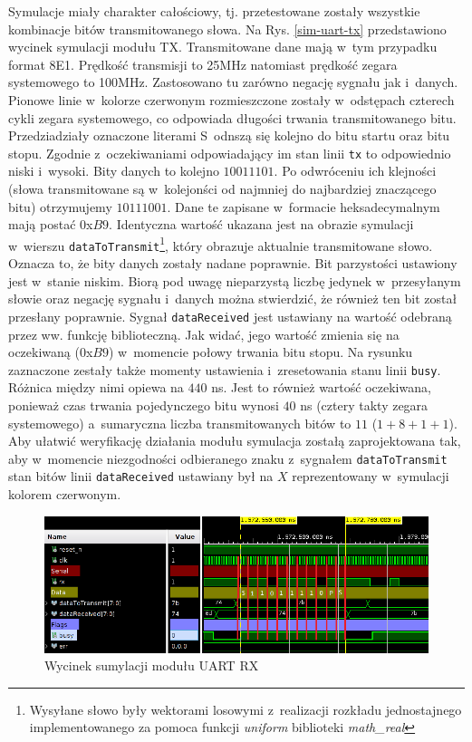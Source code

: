 Symulacje miały charakter całościowy, tj. przetestowane zostały wszystkie kombinacje bitów transmitowanego słowa. Na Rys. \ref{sim-uart-tx} przedstawiono wycinek symulacji modułu TX. Transmitowane dane mają w~tym przypadku format 8E1. Prędkość transmisji to 25MHz natomiast prędkość zegara systemowego to 100MHz. Zastosowano tu zarówno negację sygnału jak i~danych. Pionowe linie w~kolorze czerwonym rozmieszczone zostały w~odstępach czterech cykli zegara systemowego, co odpowiada długości trwania transmitowanego bitu. Przedziadziały oznaczone literami S~odnszą się kolejno do bitu startu oraz bitu stopu. Zgodnie z~oczekiwaniami odpowiadający im stan linii \verb|tx| to odpowiednio niski i~wysoki. Bity danych to kolejno $10011101$. Po odwróceniu ich klejności (słowa transmitowane są w~kolejonści od najmniej do najbardziej znaczącego bitu) otrzymujemy $10111001$. Dane te zapisane w~formacie heksadecymalnym mają postać $0$x$B9$. Identyczna wartość ukazana jest na obrazie symulacji w~wierszu \verb|dataToTransmit|\footnote{Wysyłane słowo były wektorami losowymi z~realizacji rozkładu jednostajnego implementowanego za pomoca funkcji \textit{uniform} biblioteki \textit{math\_real}}, który obrazuje aktualnie transmitowane słowo. Oznacza to, że bity danych zostały nadane poprawnie. Bit parzystości ustawiony jest w~stanie niskim. Biorą pod uwagę nieparzystą liczbę jedynek w~przesyłanym słowie oraz negację sygnału i~danych można stwierdzić, że również ten bit został przesłany poprawnie. Sygnał \verb|dataReceived| jest ustawiany na wartość odebraną przez ww. funkcję biblioteczną. Jak widać, jego wartość zmienia się na oczekiwaną ($0$x$B9$) w~momencie połowy trwania bitu stopu. Na rysunku zaznaczone zestały także momenty ustawienia i~zresetowania stanu linii \verb|busy|. Różnica między nimi opiewa na $440$ ns. Jest to również wartość oczekiwana, ponieważ czas trwania pojedynczego bitu wynosi $40$ ns (cztery takty zegara systemowego) a~sumaryczna liczba transmitowanych bitów to $11$ ($1 + 8 + 1 + 1$). Aby ułatwić weryfikację działania modułu symulacja zostałą zaprojektowana tak, aby w~momencie niezgodności odbieranego znaku z~sygnałem \verb|dataToTransmit| stan bitów linii \verb|dataReceived| ustawiany był na $X$ reprezentowany w~symulacji kolorem czerwonym.

\vspace{0.5cm}
\begin{figure}[ht]
    \centering
    \includegraphics[width=\textwidth]{img/sim/communication/uart_rx_sim.png}
    \captionsetup{format=plain,justification=centering}
    \caption{Wycinek sumylacji modułu UART RX}
    \label{sim-uart-rx}
\end{figure}
\vspace{0.5cm}

